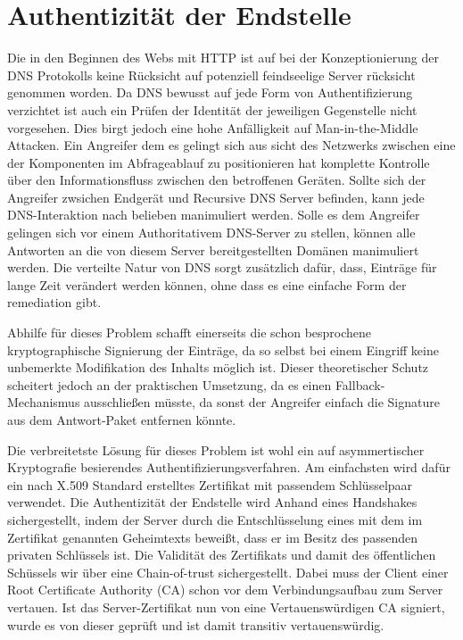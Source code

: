 

\section{Authentizität der Endstelle}
Die in den Beginnen des Webs mit HTTP ist auf bei der Konzeptionierung der DNS Protokolls keine Rücksicht auf potenziell feindseelige Server rücksicht genommen worden. Da DNS bewusst auf jede Form von Authentifizierung verzichtet ist auch ein Prüfen der Identität der jeweiligen Gegenstelle nicht vorgesehen. Dies birgt jedoch eine hohe Anfälligkeit auf Man-in-the-Middle Attacken. Ein Angreifer dem es gelingt sich aus sicht des Netzwerks zwischen eine der Komponenten im Abfrageablauf zu positionieren hat komplette Kontrolle über den Informationsfluss zwischen den betroffenen Geräten. Sollte sich der Angreifer zwsichen Endgerät und Recursive DNS Server befinden, kann jede DNS-Interaktion nach belieben manimuliert werden. Solle es dem Angreifer gelingen sich vor einem Authoritativem DNS-Server zu stellen, können alle Antworten an die von diesem Server bereitgestellten Domänen manimuliert werden. Die verteilte Natur von DNS sorgt zusätzlich dafür, dass, Einträge für lange Zeit verändert werden können, ohne dass es eine einfache Form der remediation gibt.

Abhilfe für dieses Problem schafft einerseits die schon besprochene kryptographische Signierung der Einträge, da so selbst bei einem Eingriff keine unbemerkte Modifikation des Inhalts möglich ist. Dieser theoretischer Schutz scheitert jedoch an der praktischen Umsetzung, da es einen Fallback-Mechanismus ausschließen müsste, da sonst der Angreifer einfach die Signature aus dem Antwort-Paket entfernen könnte.

Die verbreitetste Lösung für dieses Problem ist wohl ein auf asymmertischer Kryptografie besierendes Authentifizierungsverfahren. Am einfachsten wird dafür ein nach X.509 Standard erstelltes Zertifikat mit passendem Schlüsselpaar verwendet. Die Authentizität der Endstelle wird Anhand eines Handshakes sichergestellt, indem der Server durch die Entschlüsselung eines mit dem im Zertifikat genannten Geheimtexts beweißt, dass er im Besitz des passenden privaten Schlüssels ist. Die Validität des Zertifikats und damit des öffentlichen Schüssels wir über eine Chain-of-trust sichergestellt. Dabei muss der Client einer Root Certificate Authority (CA) schon vor dem Verbindungsaufbau zum Server vertauen. Ist das Server-Zertifikat nun von eine Vertauenswürdigen CA signiert, wurde es von dieser geprüft und ist damit transitiv vertauenswürdig.

